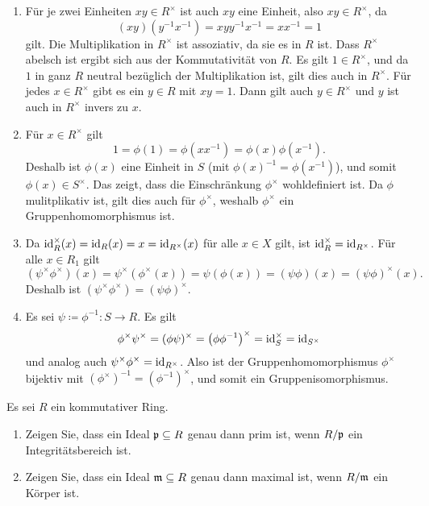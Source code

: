 \begin{solution}
  \begin{enumerate}
    \item
      Für je zwei Einheiten $xy \in R^\times$ ist auch $xy$ eine Einheit, also $xy \in R^\times$, da
      \[
          (xy)(y^{-1}x^{-1})
        = x y y^{-1} x^{-1}
        = x x^{-1}
        = 1
      \]
      gilt.
      Die Multiplikation in $R^\times$ ist assoziativ, da sie es in $R$ ist.
      Dass $R^\times$ abelsch ist ergibt sich aus der Kommutativität von $R$.
      Es gilt $1 \in R^\times$, und da $1$ in ganz $R$ neutral bezüglich der Multiplikation ist, gilt dies auch in $R^\times$.
      Für jedes $x \in R^\times$ gibt es ein $y \in R$ mit $xy = 1$.
      Dann gilt auch $y \in R^\times$ und $y$ ist auch in $R^\times$ invers zu $x$.
    \item
      Für $x \in R^\times$ gilt
      \[
          1
        = \phi(1)
        = \phi(x x^{-1})
        = \phi(x) \phi(x^{-1}).
      \]
      Deshalb ist $\phi(x)$ eine Einheit in $S$ (mit $\phi(x)^{-1} = \phi(x^{-1})$), und somit $\phi(x) \in S^\times$.
      Das zeigt, dass die Einschränkung $\phi^\times$ wohldefiniert ist.
      Da $\phi$ mulitplikativ ist, gilt dies auch für $\phi^\times$, weshalb $\phi^\times$ ein Gruppenhomomorphismus ist.
    \item
      Da $\operatorname{id}_R^\times(x) = \operatorname{id}_R(x) = x = \operatorname{id}_{R^\times}(x)$ für alle $x \in X$ gilt, ist $\operatorname{id}_R^\times = \operatorname{id}_{R^\times}$.
      Für alle $x \in R_1$ gilt
      \[
          (\psi^\times \phi^\times)(x)
        = \psi^\times(\phi^\times(x))
        = \psi(\phi(x))
        = (\psi \phi)(x)
        = (\psi \phi)^\times(x).
      \]
      Deshalb ist $(\psi^\times \phi^\times) = (\psi \phi)^\times$.
    \item
      Es sei $\psi \coloneqq \phi^{-1} \colon S \to R$.
      Es gilt
      \[
          \phi^\times \psi^\times
        = (\phi \psi)^\times
        = \left( \phi \phi^{-1} \right)^\times
        = \operatorname{id}_S^\times
        = \operatorname{id}_{S^\times}
      \]
      und analog auch $\psi^\times \phi^\times = \operatorname{id}_{R^\times}$.
      Also ist der Gruppenhomomorphismus $\phi^\times$ bijektiv mit $(\phi^\times)^{-1} = (\phi^{-1})^\times$, und somit ein Gruppenisomorphismus.
  \end{enumerate}
\end{solution}


\begin{question}[subtitle = Primideale und maximale Ideale via Quotienten]
  Es sei $R$ ein kommutativer Ring.
  \begin{enumerate}
    \item
      Zeigen Sie, dass ein Ideal $\mathfrak{p} \subseteq R$ genau dann prim ist, wenn $R/\mathfrak{p}$ ein Integritätsbereich ist.
    \item
      Zeigen Sie, dass ein Ideal $\mathfrak{m} \subseteq R$ genau dann maximal ist, wenn $R/\mathfrak{m}$ ein Körper ist. 
  \end{enumerate}
\end{question}


